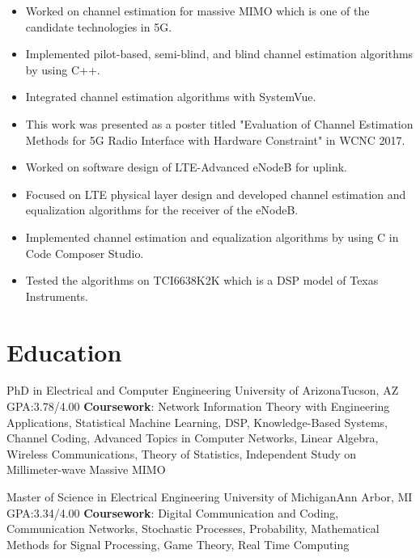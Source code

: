 \documentclass[10pt,letterpaper,roman]{moderncv}
\begin{document}
 { 
\begin{itemize}%
	\item Worked on channel estimation for massive MIMO which is one of the candidate technologies in 5G.
	\item Implemented pilot-based, semi-blind, and blind channel estimation algorithms by using C++.
	\item Integrated channel estimation algorithms with SystemVue.
	\item This work was presented as a poster titled "Evaluation of Channel Estimation Methods for 5G Radio Interface with Hardware Constraint" in WCNC 2017.
\end{itemize}} 
\vspace*{1mm} 

 { 
\begin{itemize}%
	\item Worked on software design of LTE-Advanced eNodeB for uplink.
	\item Focused on LTE physical layer design and developed channel estimation and equalization algorithms for the receiver of the eNodeB.
	\item Implemented channel estimation and equalization algorithms by using C in Code Composer Studio.
	\item Tested the algorithms on TCI6638K2K which is a DSP model of Texas Instruments.
\end{itemize}} 
\vspace*{1mm} 


\section{Education} 

{PhD in Electrical and Computer Engineering} 
{University of Arizona}{Tucson, AZ} 
{GPA:3.78/4.00} 
{\textbf{Coursework}: Network Information Theory with Engineering Applications, Statistical Machine Learning, DSP, Knowledge-Based Systems, Channel Coding, Advanced Topics in Computer Networks, Linear Algebra, Wireless Communications, Theory of Statistics, Independent Study on Millimeter-wave Massive MIMO} 
\vspace*{1mm} 

{Master of Science in Electrical Engineering} 
{University of Michigan}{Ann Arbor, MI} 
{GPA:3.34/4.00} 
{\textbf{Coursework}: Digital Communication and Coding, Communication Networks, Stochastic Processes, Probability, Mathematical Methods for Signal Processing, Game Theory, Real Time Computing} 
\vspace*{1mm} 
\end{document}

